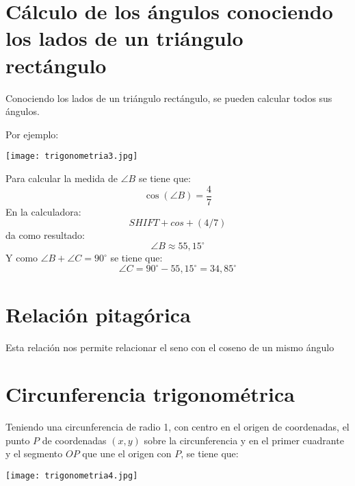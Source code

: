 \section{Cálculo de los ángulos conociendo los lados de un triángulo rectángulo}
Conociendo los lados de un triángulo rectángulo, se pueden calcular todos sus ángulos.

Por ejemplo:
\begin{center}
    \texttt{[image: trigonometria3.jpg]}
\end{center}
Para calcular la medida de $\angle B$ se tiene que:
$$\cos(\angle B) = \frac{4}{7}$$
En la calculadora:
$$\boxed{SHIFT} + \boxed{cos} + \boxed{(4/7)}$$
da como resultado:
$$\angle B \approx 55,15^\circ$$
Y como $\angle B + \angle C = 90^\circ$ se tiene que:
$$\angle C = 90^\circ - 55,15^\circ = 34,85^\circ$$

\section{Relación pitagórica}
Esta relación nos permite relacionar el seno con el coseno de un mismo ángulo


\section{Circunferencia trigonométrica}
Teniendo una circunferencia de radio 1, con centro en el origen de coordenadas, el punto $P$ de coordenadas $(x, y)$ sobre la circunferencia y en el primer cuadrante y el segmento $OP$ que une el origen con $P$, se tiene que:
\begin{center}
    \texttt{[image: trigonometria4.jpg]}
\end{center}

